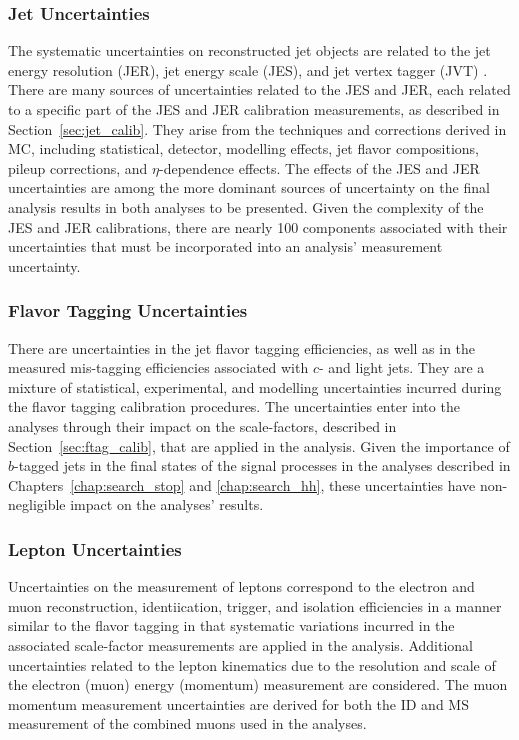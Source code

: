 \subsubsection{Jet Uncertainties}
The systematic uncertainties on reconstructed jet objects are related to the jet energy
resolution (JER), jet energy scale (JES), and jet vertex tagger (JVT) {\color{red}{don't forget to describe JVT}}.
There are many sources of uncertainties related to the JES and JER, each related to a specific
part of the JES and JER calibration measurements, as described in Section~\ref{sec:jet_calib}.
They arise from the techniques and corrections derived in MC, including statistical, detector,
modelling effects, jet flavor compositions, pileup corrections, and $\eta$-dependence effects.
The effects of the JES and JER uncertainties are among the more dominant sources of uncertainty
on the final analysis results in both analyses to be presented.
Given the complexity of the JES and JER calibrations, there are nearly 100 components associated with their uncertainties
that must be incorporated into an analysis' measurement uncertainty.

\subsubsection{Flavor Tagging Uncertainties}
There are uncertainties in the jet flavor tagging efficiencies, as well as in
the measured mis-tagging efficiencies associated with $c$- and light jets.
They are a mixture of statistical, experimental, and modelling uncertainties
incurred during the flavor tagging calibration procedures.
The uncertainties enter into the analyses through their impact on the scale-factors,
described in Section~\ref{sec:ftag_calib},
that are applied in the analysis.
Given the importance of $b$-tagged jets in the final states of the signal processes
in the analyses described in Chapters~\ref{chap:search_stop} and \ref{chap:search_hh},
these uncertainties have non-negligible impact on the analyses' results.

\subsubsection{Lepton Uncertainties}
Uncertainties on the measurement of leptons correspond to the electron and muon reconstruction,
identiication, trigger, and isolation {\color{red}{don't forget to describe lepton isolation}} efficiencies in a manner similar to the flavor tagging
in that systematic variations incurred in the associated scale-factor measurements are applied
in the analysis.
Additional uncertainties related to the lepton kinematics due to the resolution and scale of the
electron (muon) energy (momentum) measurement are considered.
The muon momentum measurement uncertainties are derived for both the ID and MS measurement
of the combined muons used in the analyses.

